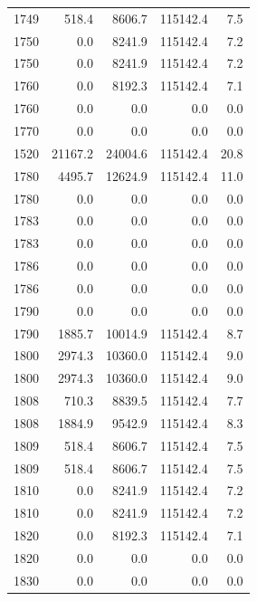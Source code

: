 \begin{longtable}{rrrrr}
    1749 & \num{518.4} & \num{8606.7} & \num{115142.4} & 7.5 \\
    1750 & \num{0.0} & \num{8241.9} & \num{115142.4} & 7.2 \\
    1750 & \num{0.0} & \num{8241.9} & \num{115142.4} & 7.2 \\
    1760 & \num{0.0} & \num{8192.3} & \num{115142.4} & 7.1 \\
    1760 & \num{0.0} & \num{0.0} & \num{0.0} & 0.0 \\
    1770 & \num{0.0} & \num{0.0} & \num{0.0} & 0.0 \\
    1520 & \num{21167.2} & \num{24004.6} & \num{115142.4} & 20.8 \\
    1780 & \num{4495.7} & \num{12624.9} & \num{115142.4} & 11.0 \\
    1780 & \num{0.0} & \num{0.0} & \num{0.0} & 0.0 \\
    1783 & \num{0.0} & \num{0.0} & \num{0.0} & 0.0 \\
    1783 & \num{0.0} & \num{0.0} & \num{0.0} & 0.0 \\
    1786 & \num{0.0} & \num{0.0} & \num{0.0} & 0.0 \\
    1786 & \num{0.0} & \num{0.0} & \num{0.0} & 0.0 \\
    1790 & \num{0.0} & \num{0.0} & \num{0.0} & 0.0 \\
    1790 & \num{1885.7} & \num{10014.9} & \num{115142.4} & 8.7 \\
    1800 & \num{2974.3} & \num{10360.0} & \num{115142.4} & 9.0 \\
    1800 & \num{2974.3} & \num{10360.0} & \num{115142.4} & 9.0 \\
    1808 & \num{710.3} & \num{8839.5} & \num{115142.4} & 7.7 \\
    1808 & \num{1884.9} & \num{9542.9} & \num{115142.4} & 8.3 \\
    1809 & \num{518.4} & \num{8606.7} & \num{115142.4} & 7.5 \\
    1809 & \num{518.4} & \num{8606.7} & \num{115142.4} & 7.5 \\
    1810 & \num{0.0} & \num{8241.9} & \num{115142.4} & 7.2 \\
    1810 & \num{0.0} & \num{8241.9} & \num{115142.4} & 7.2 \\
    1820 & \num{0.0} & \num{8192.3} & \num{115142.4} & 7.1 \\
    1820 & \num{0.0} & \num{0.0} & \num{0.0} & 0.0 \\
    1830 & \num{0.0} & \num{0.0} & \num{0.0} & 0.0 \\
\end{longtable}
\endgroup

